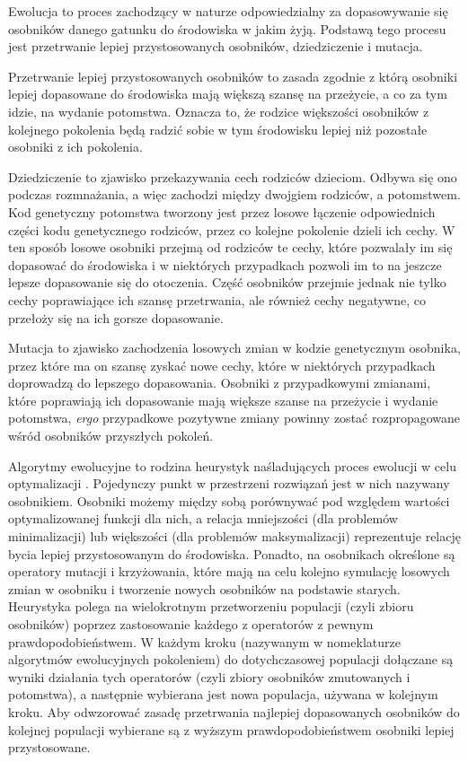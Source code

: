 \documentclass[11pt,a4paper,oneside]{report}
\begin{document}
Ewolucja to proces zachodzący w naturze odpowiedzialny za dopasowywanie się osobników danego gatunku do środowiska w jakim żyją. Podstawą tego procesu jest przetrwanie lepiej przystosowanych osobników, dziedziczenie i mutacja.

Przetrwanie lepiej przystosowanych osobników to zasada zgodnie z którą osobniki lepiej dopasowane do środowiska mają większą szansę na przeżycie, a co za tym idzie, na wydanie potomstwa. Oznacza to, że rodzice większości osobników z kolejnego pokolenia będą radzić sobie w tym środowisku lepiej niż pozostałe osobniki z ich pokolenia.

Dziedziczenie to zjawisko przekazywania cech rodziców dzieciom. Odbywa się ono podczas rozmnażania, a więc zachodzi między dwojgiem rodziców, a potomstwem. Kod genetyczny potomstwa tworzony jest przez losowe łączenie odpowiednich części kodu genetycznego rodziców, przez co kolejne pokolenie dzieli ich cechy. W ten sposób losowe osobniki przejmą od rodziców te cechy, które pozwalały im się dopasować do środowiska i w niektórych przypadkach pozwoli im to na jeszcze lepsze dopasowanie się do otoczenia. Część osobników przejmie jednak nie tylko cechy poprawiające ich szansę przetrwania, ale również cechy negatywne, co przełoży się na ich gorsze dopasowanie.

Mutacja to zjawisko zachodzenia losowych zmian w kodzie genetycznym osobnika, przez które ma on szansę zyskać nowe cechy, które w niektórych przypadkach doprowadzą do lepszego dopasowania. Osobniki z przypadkowymi zmianami, które poprawiają ich dopasowanie mają większe szanse na przeżycie i wydanie potomstwa, \textit{ergo} przypadkowe pozytywne zmiany powinny zostać rozpropagowane wśród osobników przyszłych pokoleń.

Algorytmy ewolucyjne to rodzina heurystyk naśladujących proces ewolucji w celu optymalizacji \cite{davis1991handbook}. Pojedynczy punkt w przestrzeni rozwiązań jest w nich nazywany osobnikiem. Osobniki możemy między sobą porównywać pod względem wartości optymalizowanej funkcji dla nich, a relacja mniejszości (dla problemów minimalizacji) lub większości (dla problemów maksymalizacji) reprezentuje relację bycia lepiej przystosowanym do środowiska. Ponadto, na osobnikach określone są operatory mutacji i krzyżowania, które mają na celu kolejno symulację losowych zmian w osobniku i tworzenie nowych osobników na podstawie starych. Heurystyka polega na wielokrotnym przetworzeniu populacji (czyli zbioru osobników) poprzez zastosowanie każdego z operatorów z pewnym prawdopodobieństwem. W każdym kroku (nazywanym w nomeklaturze algorytmów ewolucyjnych pokoleniem) do dotychczasowej populacji dołączane są wyniki działania tych operatorów (czyli zbiory osobników zmutowanych i potomstwa), a następnie wybierana jest nowa populacja, używana w kolejnym kroku. Aby odwzorować zasadę przetrwania najlepiej dopasowanych osobników do kolejnej populacji wybierane są z wyższym prawdopodobieństwem osobniki lepiej przystosowane.
\end{document}
